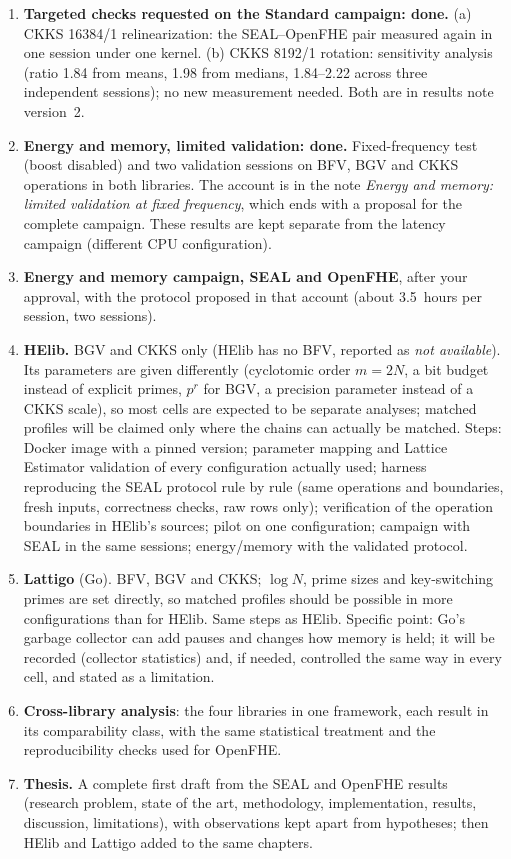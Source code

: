 \documentclass[11pt]{article}
\begin{document}
\begin{enumerate}[leftmargin=*, itemsep=3pt]
  \item \textbf{Targeted checks requested on the Standard campaign: done.} (a) CKKS 16384/1 relinearization: the SEAL--OpenFHE pair measured again in one session under one kernel. (b) CKKS 8192/1 rotation: sensitivity analysis (ratio 1.84 from means, 1.98 from medians, 1.84--2.22 across three independent sessions); no new measurement needed. Both are in results note version~2.
  \item \textbf{Energy and memory, limited validation: done.} Fixed-frequency test (boost disabled) and two validation sessions on BFV, BGV and CKKS operations in both libraries. The account is in the note \emph{Energy and memory: limited validation at fixed frequency}, which ends with a proposal for the complete campaign. These results are kept separate from the latency campaign (different CPU configuration).
  \item \textbf{Energy and memory campaign, SEAL and OpenFHE}, after your approval, with the protocol proposed in that account (about 3.5~hours per session, two sessions).
  \item \textbf{HElib.} BGV and CKKS only (HElib has no BFV, reported as \emph{not available}). Its parameters are given differently (cyclotomic order $m = 2N$, a bit budget instead of explicit primes, $p^r$ for BGV, a precision parameter instead of a CKKS scale), so most cells are expected to be separate analyses; matched profiles will be claimed only where the chains can actually be matched. Steps: Docker image with a pinned version; parameter mapping and Lattice Estimator validation of every configuration actually used; harness reproducing the SEAL protocol rule by rule (same operations and boundaries, fresh inputs, correctness checks, raw rows only); verification of the operation boundaries in HElib's sources; pilot on one configuration; campaign with SEAL in the same sessions; energy/memory with the validated protocol.
  \item \textbf{Lattigo} (Go). BFV, BGV and CKKS; $\log N$, prime sizes and key-switching primes are set directly, so matched profiles should be possible in more configurations than for HElib. Same steps as HElib. Specific point: Go's garbage collector can add pauses and changes how memory is held; it will be recorded (collector statistics) and, if needed, controlled the same way in every cell, and stated as a limitation.
  \item \textbf{Cross-library analysis}: the four libraries in one framework, each result in its comparability class, with the same statistical treatment and the reproducibility checks used for OpenFHE.
  \item \textbf{Thesis.} A complete first draft from the SEAL and OpenFHE results (research problem, state of the art, methodology, implementation, results, discussion, limitations), with observations kept apart from hypotheses; then HElib and Lattigo added to the same chapters.
\end{enumerate}
\end{document}
